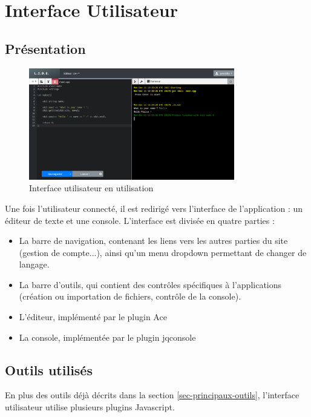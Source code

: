 \chapter{Interface Utilisateur}

\section{Présentation}

\begin{figure}[h]
  \centering
  \includegraphics[width=0.8\textwidth]{./img/frontend/example1.png}
  \caption{Interface utilisateur en utilisation}
  \label{}
\end{figure}

Une fois l'utilisateur connecté, il est redirigé vers l'interface de l'application : un éditeur de texte et une console.
L'interface est divisée en quatre parties :
\begin{itemize}
  \item La barre de navigation, contenant les liens vers les autres parties du site (gestion de compte...), ainsi qu'un menu dropdown permettant de changer de langage.
  \item La barre d'outils, qui contient des contrôles spécifiques à l'applications (création ou importation de fichiers, contrôle de la console).
  \item L'éditeur, implémenté par le plugin Ace
  \item La console, implémentée par le plugin jqconsole
\end{itemize}

\section{Outils utilisés}
En plus des outils déjà décrits dans la section \ref{sec-principaux-outils}, l'interface utilisateur utilise plusieurs plugins Javascript.

